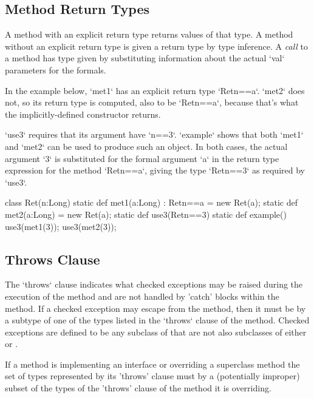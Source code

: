 \subsection{Method Return Types}

A method with an explicit return type returns values of that type.
A method without an
explicit return type is given a return type by type inference.
A {\em call} to a method has type given by substituting information about the
actual \xcd`val` parameters for the formals.

\begin{ex}

In the example below, \xcd`met1` has an explicit return type \xcd`Ret{n==a}`.
\xcd`met2` does not, so its return type is computed, also to be
\xcd`Ret{n==a}`, because that's what the implicitly-defined constructor 
returns.

\xcd`use3` requires that its argument have \xcd`n==3`.  
\xcd`example` shows that both \xcd`met1` and \xcd`met2` can be used to produce
such an object.  In both cases, the actual argument \xcd`3` is substituted for
the formal argument \xcd`a` in the return type expression for the method
\xcd`Ret{n==a}`, giving the type \xcd`Ret{n==3}` as required by \xcd`use3`.

\begin{xten}
class Ret(n:Long) {
  static def met1(a:Long) : Ret{n==a} = new Ret(a);
  static def met2(a:Long)             = new Ret(a);
  static def use3(Ret{n==3}) {}
  static def example() {
     use3(met1(3));
     use3(met2(3));
  }  
}
\end{xten}
%


\end{ex}


\subsection{Throws Clause}
The \xcd`throws` clause indicates what checked exceptions may be
raised during the execution of the method and are not handled by
\xcd'catch' blocks within the method.  If a checked exception may
escape from the method, then it must be by a subtype of one of the
types listed in the \xcd`throws` clause of the method.   Checked
exceptions are defined to be any subclass of
 that are not also subclasses of
either  or . 

If a method is implementing an interface or overriding a superclass
method the set of types represented by its \xcd'throws' clause must by
a (potentially improper) subset of the types of the \xcd'throws'
clause of the method it is overriding. 

